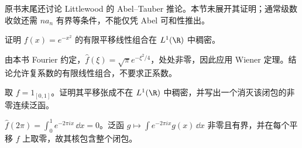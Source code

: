 原书末尾还讨论 Littlewood 的 Abel--Tauber 推论。本节未展开其证明；通常级数收敛还需 $na_n$ 有界等条件，不能仅凭 Abel 可和性推出。

\begin{exercise}[高斯平移]\label{ex:y11-gaussian-translates}
证明 $f(x)=e^{-x^2}$ 的有限平移线性组合在 $L^1(\R)$ 中稠密。
\end{exercise}
\begin{solution}
由本书 Fourier 约定，$\widehat f(\xi)=\sqrt\pi e^{-\xi^2/4}$，处处非零，因此应用 Wiener 定理。结论允许复系数的有限线性组合，不要求正系数。
\end{solution}

\begin{exercise}[一个零点就足够阻碍稠密]\label{ex:y11-zero-obstruction}
取 $f=1_{[0,1]}$。证明其平移张成不在 $L^1(\R)$ 中稠密，并写出一个消灭该闭包的非零连续泛函。
\end{exercise}
\begin{solution}
$\widehat f(2\pi)=\int_0^1e^{-2\pi ix}\,\dd x=0$。泛函 $g\mapsto\int e^{-2\pi ix}g(x)\,\dd x$ 非零且有界，并在每个平移 $f$ 上取零，故其核包含整个闭包。
\end{solution}
